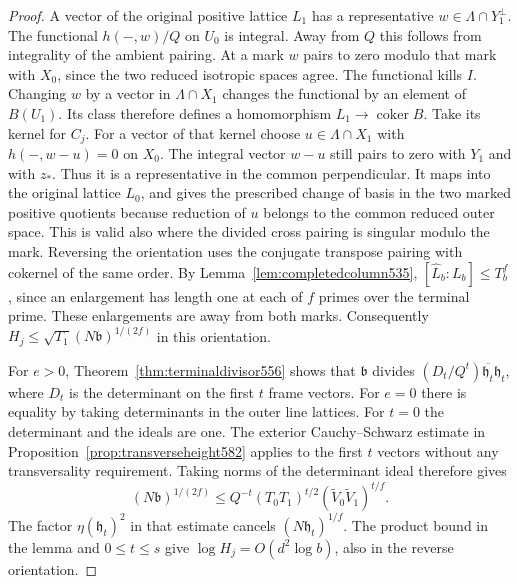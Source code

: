 \documentclass[a4paper,11pt]{article}
\theoremstyle{definition}
\theoremstyle{remark}
\numberwithin{equation}{section}
\begin{document}
\begin{proof}
A vector of the original positive lattice \(L_1\) has a representative
\(w\in\Lambda\cap Y_1^\perp\). The functional \(h(-,w)/Q\) on
\(U_0\) is integral. Away from \(Q\) this follows from integrality of
the ambient pairing. At a mark \(w\) pairs to zero modulo that mark
with \(X_0\), since the two reduced isotropic spaces agree. The
functional kills \(I\). Changing \(w\) by a vector in
\(\Lambda\cap X_1\) changes the functional by an element of
\(B(U_1)\). Its class therefore defines a homomorphism
\(L_1\to\operatorname{coker}B\). Take its kernel for \(C_j\).
For a vector of that kernel choose \(u\in\Lambda\cap X_1\) with
\(h(-,w-u)=0\) on \(X_0\). The integral vector \(w-u\) still
pairs to zero with \(Y_1\) and with \(z_*\). Thus it is a
representative in the common perpendicular. It maps into the original
lattice \(L_0\), and gives the prescribed change of basis in the two
marked positive quotients because reduction of \(u\) belongs to
the common reduced outer space. This is valid also where the
divided cross pairing is singular modulo the mark. Reversing the
orientation uses the conjugate transpose pairing with cokernel of
the same order. By Lemma~\ref{lem:completedcolumn535},
\([\widehat L_b:L_b]\le T_b^f\), since an enlargement has length
one at each of \(f\) primes over the terminal prime. These
enlargements are away from both marks. Consequently
\(H_j\le\sqrt{T_1}(N\mathfrak b)^{1/(2f)}\) in this orientation.

For \(e>0\), Theorem~\ref{thm:terminaldivisor556} shows that
\(\mathfrak b\) divides
\((D_t/Q^t)\overline{\mathfrak h_t}\mathfrak h_t\), where
\(D_t\) is the determinant on the first \(t\) frame vectors. For
\(e=0\) there is equality by taking determinants in the outer
line lattices. For \(t=0\) the determinant and the ideals are one.
The exterior Cauchy--Schwarz estimate in
Proposition~\ref{prop:transverseheight582} applies to the first
\(t\) vectors without any transversality requirement. Taking
norms of the determinant ideal therefore gives
\[
 (N\mathfrak b)^{1/(2f)}
    \le Q^{-t}(T_0T_1)^{t/2}
                        (\widetilde V_0\widetilde V_1)^{t/f}.
\]
The factor \(\eta(\mathfrak h_t)^2\) in that estimate cancels
\((N\mathfrak h_t)^{1/f}\). The product bound in the lemma and
\(0\le t\le s\) give \(\log H_j=O(d^2\log b)\), also in the
reverse orientation.
\end{proof}
\end{document}
